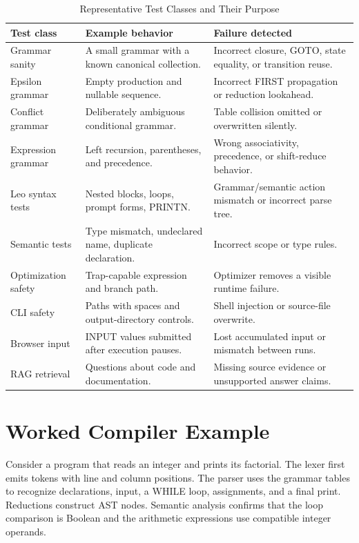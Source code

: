 \documentclass[12pt,a4paper,oneside]{report}
\begin{document}
\begin{longtable}{p{2.1cm}p{}p{}}
\caption{Representative Test Classes and Their Purpose}\\
\toprule
\textbf{Test class} & \textbf{Example behavior} & \textbf{Failure detected}\\
\midrule
Grammar sanity & A small grammar with a known canonical collection. & Incorrect closure, GOTO, state equality, or transition reuse.\\
Epsilon grammar & Empty production and nullable sequence. & Incorrect FIRST propagation or reduction lookahead.\\
Conflict grammar & Deliberately ambiguous conditional grammar. & Table collision omitted or overwritten silently.\\
Expression grammar & Left recursion, parentheses, and precedence. & Wrong associativity, precedence, or shift-reduce behavior.\\
Leo syntax tests & Nested blocks, loops, prompt forms, PRINTN. & Grammar/semantic action mismatch or incorrect parse tree.\\
Semantic tests & Type mismatch, undeclared name, duplicate declaration. & Incorrect scope or type rules.\\
Optimization safety & Trap-capable expression and branch path. & Optimizer removes a visible runtime failure.\\
CLI safety & Paths with spaces and output-directory controls. & Shell injection or source-file overwrite.\\
Browser input & INPUT values submitted after execution pauses. & Lost accumulated input or mismatch between runs.\\
RAG retrieval & Questions about code and documentation. & Missing source evidence or unsupported answer claims.\\
\bottomrule
\end{longtable}

\section{Worked Compiler Example}
Consider a program that reads an integer and prints its factorial. The lexer first emits tokens with line and column positions. The parser uses the grammar tables to recognize declarations, input, a WHILE loop, assignments, and a final print. Reductions construct AST nodes. Semantic analysis confirms that the loop comparison is Boolean and the arithmetic expressions use compatible integer operands.
\end{document}
